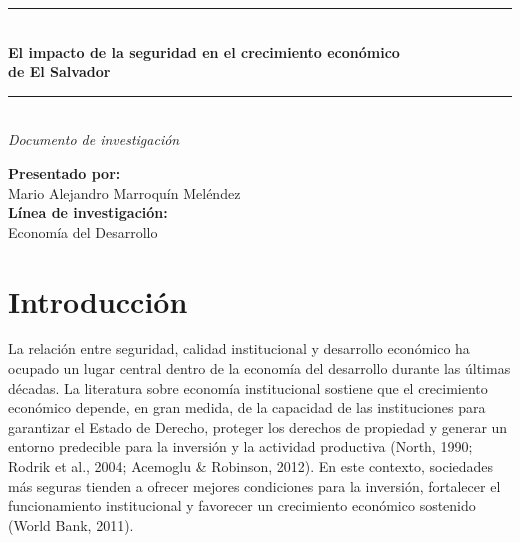 \documentclass[11pt,a4paper]{article}
\begin{document}
\begin{titlepage}
\vspace*{5cm}

\begin{center}
    \begin{tcolorbox}[
        enhanced,
        colback=white,
        colframe=azuloscuro,
        width=0.9\textwidth,
        arc=4mm,
        boxrule=1.5pt,
        drop shadow=azuloscuro!30!white, %
        borderline={0.5pt}{3pt}{dorado}, %
        left=20pt,
        right=20pt,
        top=20pt,
        bottom=20pt
    ]
        \centering
        {\color{dorado}\rule{0.6\textwidth}{1pt}}\\[0.6cm]
        {\Huge\bfseries\color{azuloscuro} El impacto de la seguridad
        en el crecimiento económico\\[0.6cm]
        de El Salvador}\\[0.6cm]
        {\color{dorado}\rule{0.6\textwidth}{1pt}}\\[0.4cm]
        {\Large\itshape\color{azulmedio} Documento de investigación}
    \end{tcolorbox}
\end{center}



\begin{center}
    \vspace{1.5cm}
    {\large\bfseries\color{azuloscuro} Presentado por:}\\[0.30cm]
    {\Large Mario Alejandro Marroquín Meléndez}\\[0.8cm]

    {\large\bfseries\color{azuloscuro} Línea de investigación:}\\[0.15cm]
    {\large Economía del Desarrollo}
\end{center}

\vspace*{2.5cm}

\end{titlepage}
% 

\section*{Introducción}

La relación entre seguridad, calidad institucional y desarrollo económico ha ocupado un lugar central dentro de la economía del desarrollo durante las últimas décadas. La literatura sobre economía institucional sostiene que el crecimiento económico depende, en gran medida, de la capacidad de las instituciones para garantizar el Estado de Derecho, proteger los derechos de propiedad y generar un entorno predecible para la inversión y la actividad productiva (North, 1990; Rodrik et al., 2004; Acemoglu \& Robinson, 2012). En este contexto, sociedades más seguras tienden a ofrecer mejores condiciones para la inversión, fortalecer el funcionamiento institucional y favorecer un crecimiento económico sostenido (World Bank, 2011).
\end{document}
